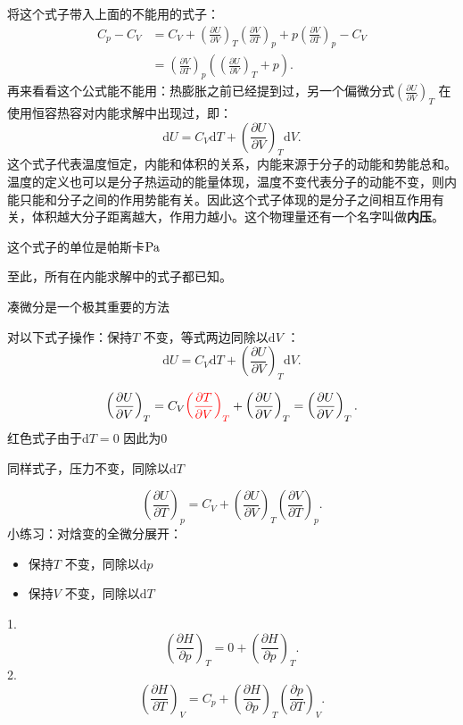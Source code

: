 将这个式子带入上面的不能用的式子：
\begin{align*}
    C_{p}-C_{V} &= C_{V} + \left(\frac{\partial U}{\partial V}\right)_{T}\left(\frac{\partial V}{\partial T}\right)_{p}+p\left(\frac{\partial V}{\partial T}\right)_{p}-C_{V}\\
    &= \left(\frac{\partial V}{\partial T}\right)_{p}\left( \left(\frac{\partial U}{\partial V}\right)_{T}+p \right)
.\end{align*}
再来看看这个公式能不能用：热膨胀之前已经提到过，另一个偏微分式$\left(\frac{\partial U}{\partial V}\right)_{T}$ 在使用恒容热容对内能求解中出现过，即：\[
    \mathrm{d}U = C_{V}\mathrm{d}T + \left(\frac{\partial U}{\partial V}\right)_{T}\mathrm{d}V
.\]
这个式子代表温度恒定，内能和体积的关系，内能来源于分子的动能和势能总和。温度的定义也可以是分子热运动的能量体现，温度不变代表分子的动能不变，则内能只能和分子之间的作用势能有关。因此这个式子体现的是分子之间相互作用有关，体积越大分子距离越大，作用力越小。这个物理量还有一个名字叫做\textbf{内压}。
\begin{notation}
    这个式子的单位是帕斯卡$\ce{Pa}$
\end{notation}
至此，所有在内能求解中的式子都已知。
\begin{notation}
    凑微分是一个极其重要的方法
\end{notation}
\begin{eg}
    对以下式子操作：保持$T$ 不变，等式两边同除以$\mathrm{d}V$ ：\[
        \mathrm{d}U = C_{V}\mathrm{d}T + \left(\frac{\partial U}{\partial V}\right)_{T}\mathrm{d}V
    .\]
\end{eg}
\[
    \left(\frac{\partial U}{\partial V}\right)_{T} = C_{V}\textcolor{red}{\left(\frac{\partial T}{\partial V}\right)_{T}} + \left(\frac{\partial U}{\partial V}\right)_{T} = \left(\frac{\partial U}{\partial V}\right)_{T}
.\]
红色式子由于$\mathrm{d}T=0$ 因此为0
\begin{eg}
    同样式子，压力不变，同除以$\mathrm{d}T$
\end{eg}
\[
    \left(\frac{\partial U}{\partial T}\right)_{p} = C_{V} + \left(\frac{\partial U}{\partial V}\right)_{T}\left(\frac{\partial V}{\partial T}\right)_{p}
.\]
小练习：对焓变的全微分展开：
\begin{itemize}
    \item 保持$T$ 不变，同除以$\mathrm{d}p$
    \item 保持$V$ 不变，同除以$\mathrm{d}T$
    
\end{itemize}
\begin{sol}
    1. \[
        \left(\frac{\partial H}{\partial p}\right)_{T} = 0+\left(\frac{\partial H}{\partial p}\right)_{T}
    .\]
    2. \[
        \left(\frac{\partial H}{\partial T}\right)_{V} = C_{p} + \left(\frac{\partial H}{\partial p}\right)_{T}\left(\frac{\partial p}{\partial T}\right)_{V}
    .\]
\end{sol}
